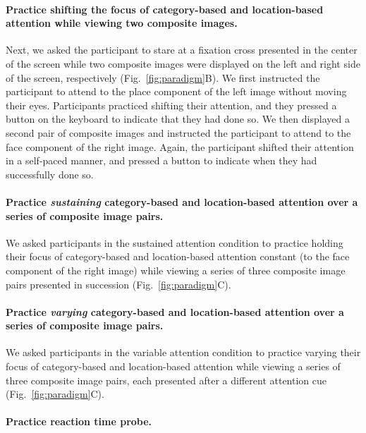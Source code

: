 \documentclass[english]{article}
\begin{document}
\paragraph{Practice shifting the focus of category-based and location-based
attention while viewing two composite images.}

Next, we asked the participant to stare at a fixation cross presented in the
center of the screen while two composite images were displayed on the left and
right side of the screen, respectively (Fig.~\ref{fig:paradigm}B). We first
instructed the participant to attend to the place component of the left image
without moving their eyes. Participants practiced shifting their attention, and
they pressed a button on the keyboard to indicate that they had done so. We
then displayed a second pair of composite images and instructed the participant
to attend to the face component of the right image. Again, the participant
shifted their attention in a self-paced manner, and pressed a button to
indicate when they had successfully done so.

\paragraph{Practice \textit{sustaining} category-based and location-based attention over
a series of composite image pairs.}

We asked participants in the sustained attention condition to practice holding
their focus of category-based and location-based attention constant (to the
face component of the right image) while viewing a series of three composite
image pairs presented in succession (Fig.~\ref{fig:paradigm}C).

\paragraph{Practice \textit{varying} category-based and location-based
attention over a series of composite image pairs.}

We asked participants in the variable attention condition to practice varying
their focus of category-based and location-based attention while viewing a
series of three composite image pairs, each presented after a different
attention cue (Fig.~\ref{fig:paradigm}C).

\paragraph{Practice reaction time probe.}
\end{document}
